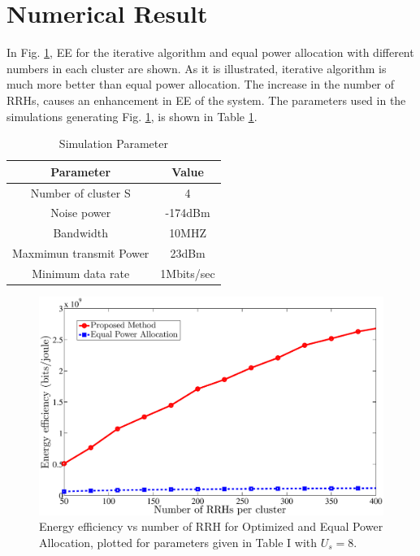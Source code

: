 \documentclass[conference,10pt,twocolumn,letter]{IEEEtran}
\begin{document}
\section{Numerical Result}
In Fig. \ref{fig:nem1},
EE for the iterative algorithm and equal power allocation with different numbers in each cluster are shown.
 As it is illustrated, iterative algorithm is much more better than equal power allocation. The increase in the number of RRHs, causes an enhancement in EE of the system.
 The parameters used in the simulations generating Fig. \ref{fig:nem1}, is shown in Table \ref{tab:title}.
 
 \begin{table}[H]
 \caption {Simulation Parameter} \label{tab:title} 
 \begin{center}
  \begin{tabular}{||c c ||} 
  \hline
  Parameter & Value \\ [0.5ex] 
  \hline\hline
  Number of cluster S & 4 \\ 
  \hline
  Noise power & -174dBm\\
  \hline
  Bandwidth & 10MHZ \\
  \hline
 Maxmimun transmit Power & 23dBm \\
  \hline
  Minimum data rate &  1Mbits/sec \\ [1ex] 
  \hline
 \end{tabular}
 \end{center}
 \end{table}
 
  \begin{figure}
  \centering
    \includegraphics[width=\columnwidth]{n123}
  \caption{Energy efficiency vs number of RRH for Optimized and Equal Power Allocation, plotted for parameters given in Table I with $U_s=8$.}
  \label{fig:nem1}
\end{figure}
\end{document}
